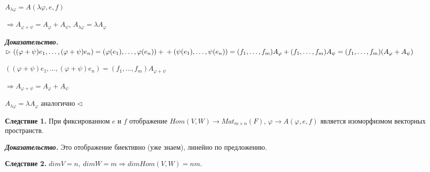 $A_{\lambda \varphi} = A(\lambda \varphi, e, f)$

$\Rightarrow A_{\varphi + \psi} = A_{\varphi} + A_{\psi}$, $A_{\lambda \varphi} = \lambda A_{\varphi}$

\vspace{\baselineskip}
\textbf{\textit{Доказательство.}} $\rhd \ ((\varphi + \psi)e_1, \dots, (\varphi + \psi)e_n) = (\varphi (e_1), \dots, \varphi (e_n)) + \\ + (\psi (e_1), \dots, \psi (e_n)) = (f_1, \dots, f_m) A_{\varphi} + (f_1, \dots, f_m) A_{\psi} = (f_1, \dots, f_m) (A_{\varphi} + A_{\psi}) $ 

$((\varphi + \psi)e_1, \dots, (\varphi + \psi)e_n) = (f_1, \dots, f_m) A_{\varphi + \psi}$

$\Rightarrow A_{\varphi + \psi} = A_{\varphi} + A_{\psi}$

$A_{\lambda \varphi} = \lambda A_{\varphi}$ аналогично $\lhd$

\vspace{\baselineskip}
\textbf{Следствие 1.} При фиксированном $e$ и $f$ отображение $Hom(V, W) \rightarrow Mat_{m \times n} (F)$, $\varphi \rightarrow A(\varphi, e, f)$ является изоморфизмом векторных пространств.

\vspace{\baselineskip}
\textbf{\textit{Доказательство.}} Это отображение биективно (уже знаем), линейно по предложению.

\vspace{\baselineskip}
\textbf{Следствие 2.} $dimV = n, \ dimW = m \Rightarrow dim Hom(V, W) = nm$.


